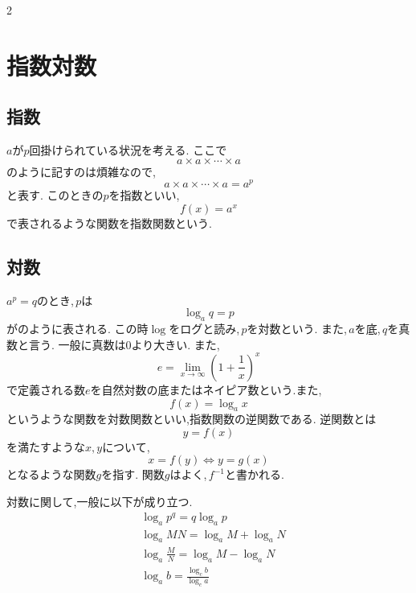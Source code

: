 \documentclass[dvipdfmx,a4paper,11pt,fleqn,openany]{jsbook}
\begin{document}
\begin{multicols*}{2}
    \section{指数対数}
      \subsection{指数}
        $a$が$p$回掛けられている状況を考える.
        ここで
        \[
          a\times a\times\cdots\times a
        \]
        のように記すのは煩雑なので,
        \[
          a\times a\times\cdots\times a=a^p
        \]
        と表す.
        このときの$p$を指数といい,
        \[
          f(x)=a^x
        \]
        で表されるような関数を指数関数という.
      \subsection{対数}
        $a^p=q$のとき,\,$p$は
        \[
          \log_a{q}=p
        \]
        がのように表される.
        この時$\log$をログと読み,\,$p$を対数という.
        また,\,$a$を底,\,$q$を真数と言う.
        一般に真数は0より大きい.
        また,
        \[
          e=\lim_{x \to \infty} \left(1+\frac{1}{x}\right)^x
        \]
        で定義される数$e$を自然対数の底またはネイピア数という.また,
        \[
          f(x)=\log_a x
        \]
        というような関数を対数関数といい,指数関数の逆関数である.
        逆関数とは
        \[
          y=f(x)
        \]
        を満たすような$x,y$について,
        \[
          x=f(y) \iff y=g(x)
        \]
        となるような関数$g$を指す.
        関数$g$はよく,\,$f^{-1}$と書かれる.

        対数に関して,一般に以下が成り立つ.
        \begin{align*}
          &\log_a{p^q}=q\log_a{p}\\
          &\log_a{MN}=\log_a{M}+\log_a{N}\\
          &\log_a{\frac{M}{N}}=\log_a{M}-\log_a{N}\\
          &\log_a{b}=\frac{\log_c{b}}{\log_c{a}}
        \end{align*}
      
\end{multicols*}
\end{document}
